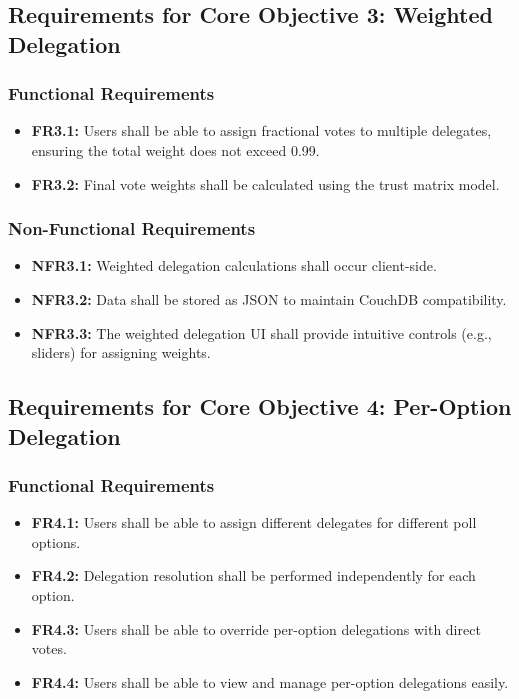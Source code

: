 \subsection{Requirements for Core Objective 3: Weighted Delegation}
\subsubsection{Functional Requirements}
\begin{itemize}
    \item \textbf{FR3.1:} Users shall be able to assign fractional votes to multiple delegates, ensuring the total weight does not exceed 0.99.
    \item \textbf{FR3.2:} Final vote weights shall be calculated using the trust matrix model.
\end{itemize}

\subsubsection{Non-Functional Requirements}
\begin{itemize}
    \item \textbf{NFR3.1:} Weighted delegation calculations shall occur client-side.
    \item \textbf{NFR3.2:} Data shall be stored as JSON to maintain CouchDB compatibility.
    \item \textbf{NFR3.3:} The weighted delegation UI shall provide intuitive controls (e.g., sliders) for assigning weights.
\end{itemize}

\subsection{Requirements for Core Objective 4: Per-Option Delegation}
\subsubsection{Functional Requirements}
\begin{itemize}
    \item \textbf{FR4.1:} Users shall be able to assign different delegates for different poll options.
    \item \textbf{FR4.2:} Delegation resolution shall be performed independently for each option.
    \item \textbf{FR4.3:} Users shall be able to override per-option delegations with direct votes.
    \item \textbf{FR4.4:} Users shall be able to view and manage per-option delegations easily.
\end{itemize}

